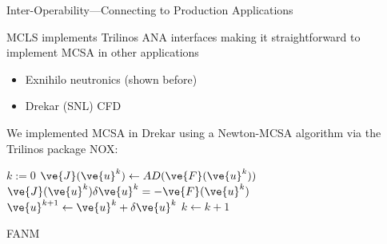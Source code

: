 \documentclass{beamer}
\begin{document}
\begin{frame}{Inter-Operability---Connecting to Production Applications}

  MCLS implements Trilinos ANA interfaces making it straightforward to
  implement MCSA in other applications
  \begin{itemize}
  \item Exnihilo neutronics (shown before)
  \item Drekar (SNL) CFD
  \end{itemize}
  \vfill
  We implemented MCSA in Drekar using a Newton-MCSA algorithm via the Trilinos
  package NOX:
  \begin{algorithm}[H]
    \footnotesize
    \begin{algorithmic}[1]
      \STATE $k := 0$
      \STATE $\ve{J}(\ve{u}^{k}) \leftarrow AD(\ve{F}(\ve{u}^k))$
      \STATE $\ve{J}(\ve{u}^k) \delta \ve{u}^k = -\ve{F}(\ve{u}^{k})$
      \STATE $\ve{u}^{k+1} \leftarrow \ve{u}^k + \delta \ve{u}^k$
      \STATE $k \leftarrow k+1$
      \ENDWHILE
    \end{algorithmic}
    \caption{FANM}
  \end{algorithm}
  \vfill
  \centering

\end{frame}

\end{document}
